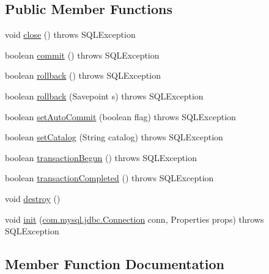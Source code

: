 \subsection*{Public Member Functions}
\begin{DoxyCompactItemize}
\item 
void \mbox{\hyperlink{classtestsuite_1_1simple_1_1_test_lifecycle_interceptor_ace03032cbe6f9aae94a05ae442466d2d}{close}} ()  throws S\+Q\+L\+Exception 
\item 
boolean \mbox{\hyperlink{classtestsuite_1_1simple_1_1_test_lifecycle_interceptor_a1c51358948a855403a8953f3d4ba5590}{commit}} ()  throws S\+Q\+L\+Exception 
\item 
boolean \mbox{\hyperlink{classtestsuite_1_1simple_1_1_test_lifecycle_interceptor_a7cdeb42f7891e22dadce89627befbcdf}{rollback}} ()  throws S\+Q\+L\+Exception 
\item 
boolean \mbox{\hyperlink{classtestsuite_1_1simple_1_1_test_lifecycle_interceptor_a75e431938104c0c3b8e1913b81ced992}{rollback}} (Savepoint s)  throws S\+Q\+L\+Exception 
\item 
boolean \mbox{\hyperlink{classtestsuite_1_1simple_1_1_test_lifecycle_interceptor_a98376ea207527feed3bc76d491c98cc2}{set\+Auto\+Commit}} (boolean flag)  throws S\+Q\+L\+Exception 
\item 
boolean \mbox{\hyperlink{classtestsuite_1_1simple_1_1_test_lifecycle_interceptor_accae42bd1b1d7a51fa35a6f375bf4ce4}{set\+Catalog}} (String catalog)  throws S\+Q\+L\+Exception 
\item 
boolean \mbox{\hyperlink{classtestsuite_1_1simple_1_1_test_lifecycle_interceptor_a5ca18da030f4569891254990898f9c1b}{transaction\+Begun}} ()  throws S\+Q\+L\+Exception 
\item 
boolean \mbox{\hyperlink{classtestsuite_1_1simple_1_1_test_lifecycle_interceptor_a00973c1a52ebc81176be2b9a46f5aa66}{transaction\+Completed}} ()  throws S\+Q\+L\+Exception 
\item 
void \mbox{\hyperlink{classtestsuite_1_1simple_1_1_test_lifecycle_interceptor_a2a1a99507005bb6d901d3782880aac09}{destroy}} ()
\item 
void \mbox{\hyperlink{classtestsuite_1_1simple_1_1_test_lifecycle_interceptor_ad1b9b390383950835ad6b7550c27589e}{init}} (\mbox{\hyperlink{interfacecom_1_1mysql_1_1jdbc_1_1_connection}{com.\+mysql.\+jdbc.\+Connection}} conn, Properties props)  throws S\+Q\+L\+Exception 
\end{DoxyCompactItemize}


\subsection{Member Function Documentation}
\mbox{\label{classtestsuite_1_1simple_1_1_test_lifecycle_interceptor_ace03032cbe6f9aae94a05ae442466d2d}} 
